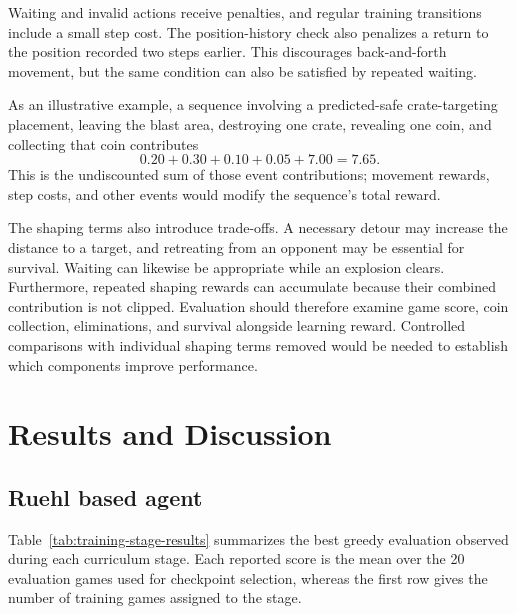 \documentclass[11pt,a4paper]{article}
\begin{document}
Waiting and invalid actions receive penalties, and regular training
transitions include a small step cost. The position-history check
also penalizes a return to the position recorded two steps earlier.
This discourages back-and-forth movement, but the same condition can
also be satisfied by repeated waiting.

As an illustrative example, a sequence involving a predicted-safe
crate-targeting placement, leaving the blast area, destroying one
crate, revealing one coin, and collecting that coin contributes
\[
0.20 + 0.30 + 0.10 + 0.05 + 7.00 = 7.65.
\]
This is the undiscounted sum of those event contributions; movement
rewards, step costs, and other events would modify the sequence's
total reward.

The shaping terms also introduce trade-offs. A necessary detour may
increase the distance to a target, and retreating from an opponent
may be essential for survival. Waiting can likewise be appropriate
while an explosion clears. Furthermore, repeated shaping rewards
can accumulate because their combined contribution is not clipped.
Evaluation should therefore examine game score, coin collection,
eliminations, and survival alongside learning reward. Controlled
comparisons with individual shaping terms removed would be needed
to establish which components improve performance.

\FloatBarrier

\section{Results and Discussion}
\label{sec:results}

\subsection{Ruehl based agent}
Table~\ref{tab:training-stage-results} summarizes the best greedy evaluation
observed during each curriculum stage. Each reported score is the mean over
the 20 evaluation games used for checkpoint selection, whereas the first row
gives the number of training games assigned to the stage.
\end{document}
